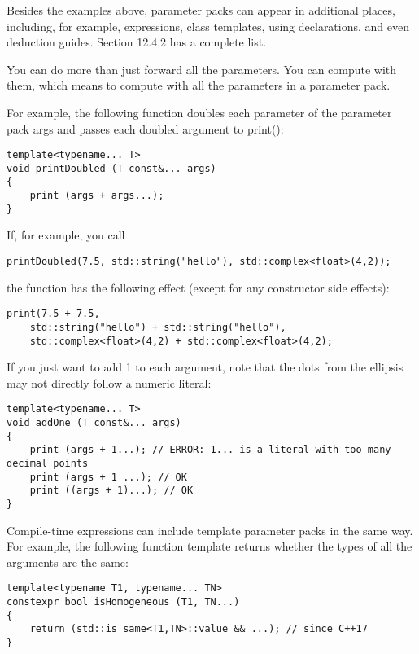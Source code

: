 
Besides the examples above, parameter packs can appear in additional places, including, for example, expressions, class templates, using declarations, and even deduction guides. Section 12.4.2 has a complete list.


You can do more than just forward all the parameters. You can compute with them, which means to compute with all the parameters in a parameter pack.

For example, the following function doubles each parameter of the parameter pack args and passes each doubled argument to print():

\begin{lstlisting}[style=styleCXX]
template<typename... T>
void printDoubled (T const&... args)
{
	print (args + args...);
}
\end{lstlisting}

If, for example, you call

\begin{lstlisting}[style=styleCXX]
printDoubled(7.5, std::string("hello"), std::complex<float>(4,2));
\end{lstlisting}

the function has the following effect (except for any constructor side effects):

\begin{lstlisting}[style=styleCXX]
print(7.5 + 7.5,
	std::string("hello") + std::string("hello"),
	std::complex<float>(4,2) + std::complex<float>(4,2);
\end{lstlisting}

If you just want to add 1 to each argument, note that the dots from the ellipsis may not directly follow a numeric literal:

\begin{lstlisting}[style=styleCXX]
template<typename... T>
void addOne (T const&... args)
{
	print (args + 1...); // ERROR: 1... is a literal with too many decimal points
	print (args + 1 ...); // OK
	print ((args + 1)...); // OK
}
\end{lstlisting}

Compile-time expressions can include template parameter packs in the same way. For example, the following function template returns whether the types of all the arguments are the same:

\begin{lstlisting}[style=styleCXX]
template<typename T1, typename... TN>
constexpr bool isHomogeneous (T1, TN...)
{
	return (std::is_same<T1,TN>::value && ...); // since C++17
}
\end{lstlisting}

